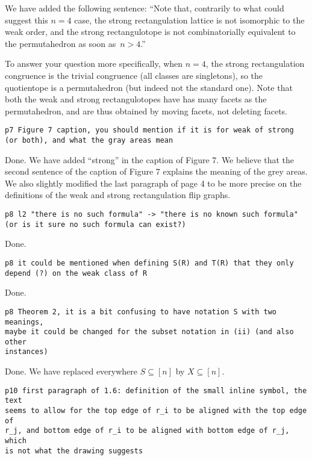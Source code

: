 \documentclass{article}
\begin{document}
We have added the following sentence: ``Note that, contrarily to what could suggest this $n = 4$ case, the strong rectangulation lattice is not isomorphic to the weak order, and the strong rectangulotope is not combinatorially equivalent to the permutahedron as soon as~$n > 4$.''

To answer your question more specifically, when $n=4$, the strong rectangulation congruence is the trivial congruence (all classes are singletons), so the quotientope is a permutahedron (but indeed not the standard one). Note that both the weak and strong rectangulotopes have has many facets as the permutahedron, and are thus obtained by moving facets, not deleting facets.


\begin{verbatim}
p7 Figure 7 caption, you should mention if it is for weak of strong 
(or both), and what the gray areas mean
\end{verbatim}

Done. We have added ``strong'' in the caption of Figure 7. We believe that the second sentence of the caption of Figure 7 explains the meaning of the grey areas. We also slightly modified the last paragraph of page 4 to be more precise on the definitions of the weak and strong rectangulation flip graphs.

\begin{verbatim}
p8 l2 "there is no such formula" -> "there is no known such formula" 
(or is it sure no such formula can exist?)
\end{verbatim}

Done.

\begin{verbatim}
p8 it could be mentioned when defining S(R) and T(R) that they only 
depend (?) on the weak class of R
\end{verbatim}

Done.

\begin{verbatim}
p8 Theorem 2, it is a bit confusing to have notation S with two meanings, 
maybe it could be changed for the subset notation in (ii) (and also other 
instances)
\end{verbatim}

Done. We have replaced everywhere $S \subseteq [n]$ by $X \subseteq [n]$.

\begin{verbatim}
p10 first paragraph of 1.6: definition of the small inline symbol, the text 
seems to allow for the top edge of r_i to be aligned with the top edge of 
r_j, and bottom edge of r_i to be aligned with bottom edge of r_j, which 
is not what the drawing suggests
\end{verbatim}
\end{document}
